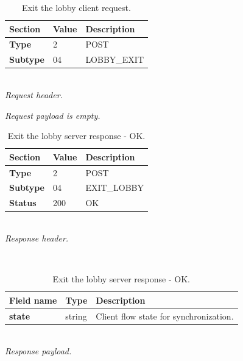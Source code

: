 \documentclass[english, sem, kiv, he, iso690alph, pdf, viewonly]{fasthesis}
\begin{document}
\begin{table}[h!]
	\centering
	\begin{minipage}[b]{0.45\textwidth}
		\centering
		\begin{tabular}{|l|l|l|}
			\hline
			\textbf{Section} & \textbf{Value} & \textbf{Description} \\ \hline
			\textbf{Type} & 2 & \footnotesize{POST} \\ \hline
			\textbf{Subtype} & 04 & \footnotesize{LOBBY\_EXIT}  \\ \hline
		\end{tabular} \\
		\textit{Request header.}
	\end{minipage} 
	\hfill
	\begin{minipage}[b]{0.5\textwidth}
		\centering
		\textit{Request payload is empty.}
	\end{minipage}	
	\caption{Exit the lobby client request.}
	\label{tab:exit_lobby_request}
\end{table}

\begin{table}[h!]
	\centering
	\begin{minipage}[b]{1.0\textwidth}
		\centering
		\begin{tabular}{|l|l|l|}
			\hline
			\textbf{Section} & \textbf{Value} & \textbf{Description} \\ \hline
			\textbf{Type} & 2 & \footnotesize{POST} \\ \hline
			\textbf{Subtype} & 04 & \footnotesize{EXIT\_LOBBY}  \\ \hline
			\textbf{Status} & 200 & \footnotesize{OK} \\ \hline
		\end{tabular} \\
		\textit{Response header.}
	\end{minipage} 
	\\
	\vspace{10pt}
	\begin{minipage}[b]{1.0\textwidth}
		\centering
		\begin{tabular}{|l|l|l|}
			\hline
			\textbf{Field name} & \textbf{Type} & \textbf{Description} \\ \hline
			\textbf{state} & string & Client flow state for synchronization. \\ \hline
		\end{tabular} \\
		\textit{Response payload.}
	\end{minipage}	
	\caption{Exit the lobby server response - OK.}
	\label{tab:exit_lobby_response_ok}
\end{table}
\end{document}
